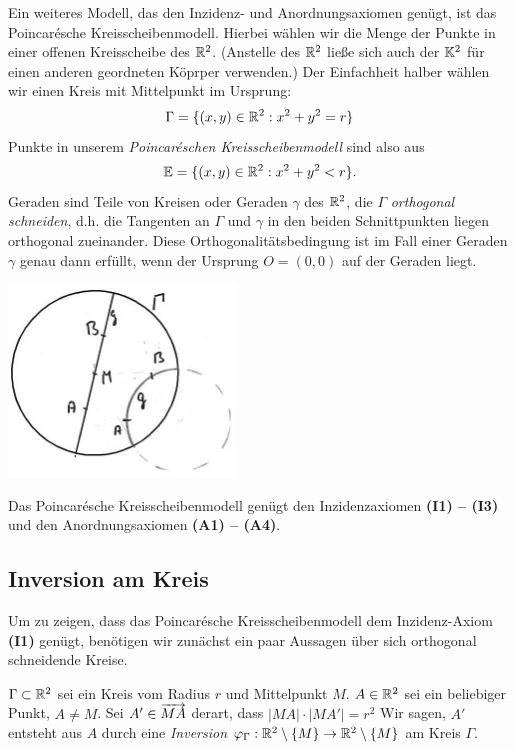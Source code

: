 Ein weiteres Modell, das den Inzidenz- und Anordnungsaxiomen genügt, ist das Poincarésche
Kreisscheibenmodell. Hierbei wählen wir die Menge der Punkte in einer offenen Kreisscheibe des
$\mathbb R^2$. (Anstelle des $\mathbb R^2$ ließe sich auch der $\mathbb K^2$ für einen anderen geordneten Köprper
verwenden.) Der Einfachheit halber wählen wir einen Kreis mit Mittelpunkt im Ursprung:
$$
    \Gamma = \{ (x,y) \in \mathbb R^2 :  x^2 + y^2 = r \}
$$
Punkte in unserem {\em  Poincaréschen Kreisscheibenmodell} sind also aus
$$
    \mathbb E = \{ (x,y) \in \mathbb R^2 :  x^2 + y^2 < r \}.
$$
Geraden sind Teile von Kreisen oder Geraden $\gamma$ des $\mathbb R^2$, die $\Gamma$ {\em orthogonal
schneiden}, d.h. die Tangenten an $\Gamma$ und $\gamma$ in den beiden Schnittpunkten liegen
orthogonal zueinander. Diese Orthogonalitätsbedingung ist im Fall einer Geraden $\gamma$ genau dann
erfüllt, wenn der Ursprung $O = (0,0)$ auf der Geraden liegt.

\centerline{\includegraphics[width=6cm]{BILDER/4-2-04b-Geraden.jpg}}

\begin{thm} \label{thm:PoincareKreisscheibe}
    Das Poincarésche Kreisscheibenmodell genügt den Inzidenzaxiomen {\bf (I1) -- (I3)} und den
    Anordnungsaxiomen {\bf (A1) -- (A4)}.
\end{thm}

\subsection*{Inversion am Kreis}

Um zu zeigen, dass das Poincarésche Kreisscheibenmodell dem Inzidenz-Axiom {\bf (I1)} genügt,
benötigen wir zunächst ein paar Aussagen über sich orthogonal schneidende Kreise.


\begin{defi}
    $\Gamma \subset \mathbb R^2$ sei ein Kreis vom Radius $r$ und Mittelpunkt $M$. $A \in \mathbb R^2$ sei ein
    beliebiger Punkt, $A \neq M$. Sei $A' \in \mbox{${\overrightarrow{MA}}$}$ derart, dass $|MA| \cdot |MA'| = r^2$
    Wir sagen, $A'$ entsteht aus $A$ durch eine \emph{Inversion} $\varphi_\Gamma :
    \mathbb R^2 \setminus\{M\} \to \mathbb R^2 \setminus \{M\}$ am Kreis $\Gamma$.
\end{defi}

